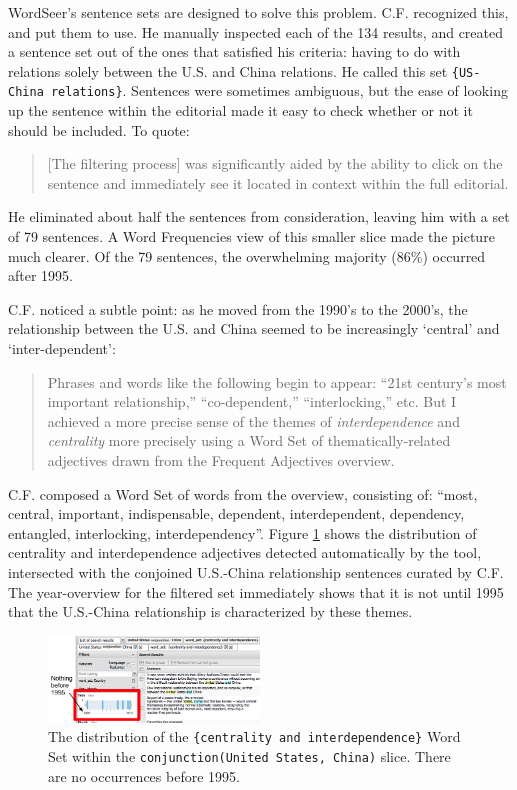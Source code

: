 \documentclass{sig-alternate}
\newcommand{\code}[1] {\texttt{#1}}
\begin{document}
WordSeer's sentence sets are designed to solve this problem. C.F. recognized this, and put them to use. He manually inspected each of the 134 results, and created a sentence set out of the ones that satisfied his criteria: having to do with relations solely between the U.S. and China relations.  He called this set \code{\{US-China relations\}}. Sentences were sometimes ambiguous, but the ease of looking up the sentence within the editorial made it easy to check whether or not it should be included. To quote:
\begin{quote}
[The filtering process] was significantly aided by the ability to click on the sentence and immediately see it located in context within the full editorial.
\end{quote}
He eliminated about half the sentences from consideration, leaving him with a set of  79 sentences. A Word Frequencies view of this smaller slice made the picture much clearer. Of the 79 sentences, the overwhelming majority (86\%) occurred after 1995.

C.F. noticed a subtle point: as he moved from the 1990's to the 2000's, the relationship between the U.S. and China seemed to be increasingly  `central' and `inter-dependent':
\begin{quote}
Phrases and words like the following begin to appear: ``21st century's most important relationship,'' ``co-dependent,'' ``interlocking,'' etc. But I achieved a more precise sense of the themes of \emph{interdependence} and \emph{centrality } more precisely using a Word Set of thematically-related adjectives drawn from the Frequent Adjectives overview.
\end{quote}
C.F. composed a Word Set of words from the overview, consisting of: ``most, central, important, indispensable, dependent, interdependent, dependency, entangled, interlocking, interdependency''.   Figure \ref{fig:chris07} shows the distribution of centrality and interdependence adjectives detected automatically by the tool, intersected with the conjoined U.S.-China relationship sentences curated by C.F. The year-overview for the filtered set immediately shows that it is not until 1995 that the U.S.-China relationship is characterized by these themes.

\begin{figure}[h!]
\includegraphics[width=0.5\textwidth]{fig/chris/07.png}
\caption{ The distribution of the \code{\{centrality and interdependence\}} Word Set within the \code{conjunction(United States, China)} slice. There are no occurrences before 1995. \label{fig:chris07}}
\end{figure}
\end{document}

